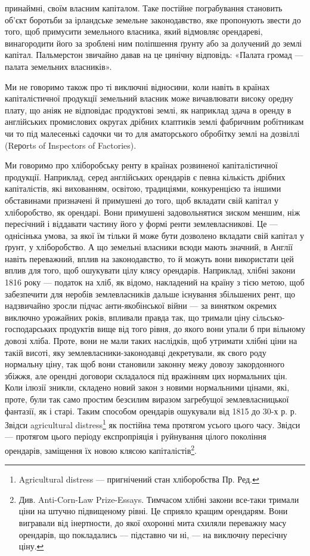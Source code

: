 принаймні, своїм власним капіталом. Таке постійне пограбування становить об’єкт
боротьби за ірландське земельне законодавство, яке пропонують звести до того,
щоб примусити земельного власника, який відмовляє орендареві, винагородити
його за зроблені ним поліпшення ґрунту або за долучений до землі капітал.
Пальмерстон звичайно давав на це цинічну відповідь: «Палата громад — палата
земельних власників».

Ми не говоримо також про ті виключні відносини, коли навіть в країнах
капіталістичної продукції земельний власник може вичавлювати високу оредну
плату, що аніяк не відповідає продуктові землі, як наприклад здача в оренду
в англійських промислових округах дрібних клаптиків землі фабричним робітникам
чи то під малесенькі садочки чи то для аматорського обробітку землі на
дозвіллі (Rероrts of Inspectors of Factories).

Ми говоримо про хліборобську ренту в країнах розвиненої капіталістичної
продукції. Наприклад, серед англійських орендарів є певна кількість дрібних
капіталістів, які вихованням, освітою, традиціями, конкуренцією та іншими обставинами
призначені й примушені до того, щоб вкладати свій капітал у
хліборобство, як орендарі. Вони примушені задовольнятися зиском меншим,
ніж пересічний і віддавати частину його у формі ренти землевласникові. Це —
однісінька умова, за якої їм тільки й може бути дозволено вкладати свій
капітал у ґрунт, у хліборобство. А що земельні власники всюди мають значний,
в Англії навіть переважний, вплив на законодавство, то й можуть вони використати
цей вплив для того, щоб ошукувати цілу клясу орендарів. Наприклад,
хлібні закони 1816 року — податок на хліб, як відомо, накладений на
країну з тією метою, щоб забезпечити для неробів землевласників дальше існування
збільшених рент, що надзвичайно зросли підчас анти-якобінської війни —
за винятком окремих виключно урожайних років, впливали правда так, що тримали
ціну сільсько-господарських продуктів вище від того рівня, до якого вони
упали б при вільному довозі хліба. Проте, вони не мали таких наслідків, щоб
утримати хлібні ціни на такій висоті, яку землевласники-законодавці декретували,
як свого роду нормальну ціну, так щоб вони становили законну межу довозу
закордонного збіжжя, але орендні договори складалося під вражінням цих
нормальних цін. Коли ілюзії зникли, складено новий закон з новими нормальними
цінами, які, проте, були так само простим безсилим виразом загребущої
землевласницької фантазії, як і старі. Таким способом орендарів ошукували
від 1815 до 30-х р. р. Звідси agricultural distress\footnote*{
Agricultural distress — пригнічений стан хліборобства Пр. Ред.
} як постійна тема протягом
усього цього часу. Звідси — протягом цього періоду експропріяція і руйнування
цілого покоління орендарів, заміщення їх новою клясою капіталістів\footnote{
Див. Anti-Corn-Law Prize-Essays. Тимчасом хлібні закони все-таки тримали ціни на штучно
підвищеному рівні. Це сприяло кращим орендарям. Вони вигравали від інертности, до якої охоронні
мита схиляли переважну масу орендарів, що покладались — підставно чи ні, — на виключну
пересічну ціну.
}.

